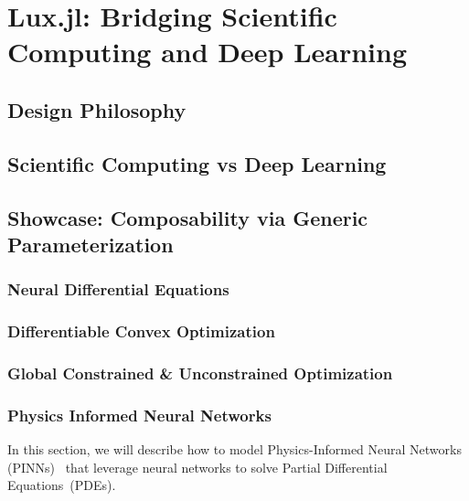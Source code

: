 \chapter{Lux.jl: Bridging Scientific Computing and Deep Learning}
\label{chapter:lux_bridging_scientific_computing_and_deep_learning}


\section{Design Philosophy}
\label{sec:design_philosophy}

\section{Scientific Computing vs Deep Learning}
\label{sec:scientific_computing_vs_deep_learning}

\section{Showcase: Composability via Generic Parameterization}
\label{sec:composability}

\subsection{Neural Differential Equations}
\label{subsec:differential_equations_lux}

\subsection{Differentiable Convex Optimization}
\label{subsec:convex_optimization_lux}

\subsection{Global Constrained \& Unconstrained Optimization}
\label{subsec:global_optimization_lux}

\subsection{Physics Informed Neural Networks}
\label{subsec:physics_informed_neural_networks_lux}

In this section, we will describe how to model Physics-Informed Neural Networks (PINNs)~\citep{raissi2019physics} that leverage neural networks to solve Partial Differential Equations~(PDEs).

